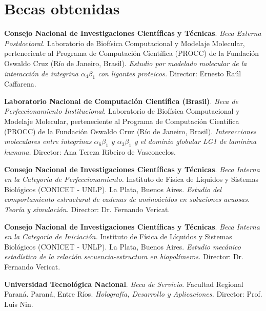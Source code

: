 \section{Becas obtenidas}
 \textbf{Consejo Nacional de Investigaciones Científicas y Técnicas}. \emph{Beca Externa Postdoctoral.} Laboratorio de Biofísica Computacional y Modelaje Molecular, perteneciente al Programa de Computación Científica (PROCC) de la Fundación Oswaldo Cruz (Río de Janeiro, Brasil). \textit{Estudio por modelado molecular de la interacción de integrina $\alpha_4 \beta_1$ con ligantes proteicos.} Director: Ernesto Raúl Caffarena.

 \textbf{Laboratorio Nacional de Computación Científica (Brasil)}. \emph{Beca de Perfeccionamiento Institucional.} Laboratorio de Biofísica Computacional y Modelaje Molecular, perteneciente al Programa de Computación Científica (PROCC) de la Fundación Oswaldo Cruz (Río de Janeiro, Brasil). \textit{Interacciones moleculares entre integrinas $\alpha_6 \beta_1$ y $\alpha_3 \beta_1$ y el dominio globular LG1 de laminina humana.} Director: Ana Tereza Ribeiro de Vasconcelos.

 \textbf{Consejo Nacional de Investigaciones Científicas y Técnicas}. \emph{Beca Interna en la Categoría de Perfeccionamiento.} Instituto de Física de Líquidos y Sistemas Biológicos (CONICET - UNLP). La Plata, Buenos Aires. \textit{Estudio del comportamiento estructural de cadenas de aminoácidos en soluciones acuosas. Teoría y simulación.} Director: Dr. Fernando Vericat.

 \textbf{Consejo Nacional de Investigaciones Científicas y Técnicas}. \emph{Beca Interna en la Categoría de Iniciación.} Instituto de Física de Líquidos y Sistemas Biológicos (CONICET - UNLP). La Plata, Buenos Aires. \textit{Estudio mecánico estadístico de la relación secuencia-estructura en biopolímeros.} Director: Dr. Fernando Vericat.

 \textbf{Universidad Tecnológica Nacional}.   \emph{Beca de Servicio}. Facultad Regional Paraná. Paraná, Entre Ríos. \textit{Holografía, Desarrollo y Aplicaciones.} Director: Prof. Luis Nin.
